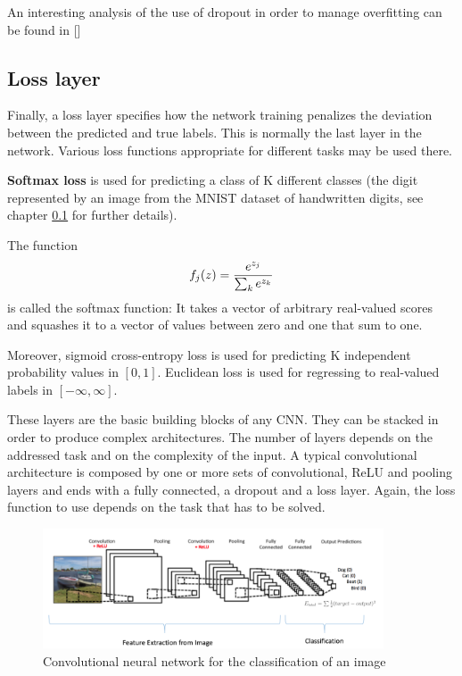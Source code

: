 An interesting analysis of the use of dropout in order to manage overfitting can be found in [\cite{Srivastava:2014:DSW:2627435.2670313}]

\subsection{Loss layer}

Finally, a loss layer specifies how the network training penalizes the deviation between the predicted and true labels. This is normally the last layer in the network. Various loss functions appropriate for different tasks may be used there. 

\textbf{Softmax loss} is used for predicting a class of K different classes (\ie the digit represented by an image from the MNIST dataset of handwritten digits, see chapter \ref{} for further details).

The function
\begin{equation} \notag
	f_j(z)=\frac{e^{z_j}}{\sum_{k}e^{z_k}}
\end{equation}
is called the softmax function: It takes a vector of arbitrary real-valued scores and squashes it to a vector of values between zero and one that sum to one.

Moreover, sigmoid cross-entropy loss is used for predicting K independent probability values in $[0,1]$. Euclidean loss is used for regressing to real-valued labels in $[-\infty ,\infty ]$.

\bigskip

These layers are the basic building blocks of any \acs{CNN}. They can be stacked in order to produce complex architectures. The number of layers depends on the addressed task and on the complexity of the input. A typical convolutional architecture is composed by one or more sets of convolutional, \acs{ReLU} and pooling layers and ends with a fully connected, a dropout and a loss layer. Again, the loss function to use depends on the task that has to be solved.

\begin{figure}[b]
	\centering
	\includegraphics[width=0.9\textwidth]{Images/conv_architecture}
	\caption{Convolutional neural network for the classification of an image}\label{fig:conv_architecture}
\end{figure}

